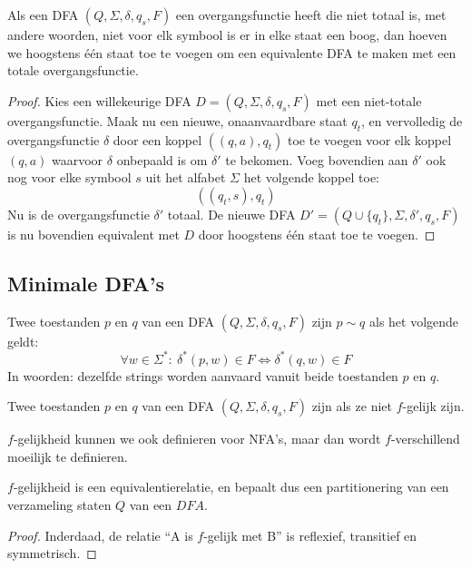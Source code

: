 \documentclass[main.tex]{subfiles}
\begin{document}
\begin{st}
  \label{st:dfa-totale-overgangsfunctie}
  Als een DFA $(Q,\Sigma,\delta,q_{s},F)$ een overgangsfunctie heeft die niet totaal is, met andere woorden, niet voor elk symbool is er in elke staat een boog, dan hoeven we hoogstens \'e\'en staat toe te voegen om een equivalente DFA te maken met een totale overgangsfunctie.

  \begin{proof}
   Kies een willekeurige DFA $D = (Q,\Sigma,\delta,q_{s},F)$ met een niet-totale overgangsfunctie.
   Maak nu een nieuwe, onaanvaardbare staat $q_{t}$, en vervolledig de overgangsfunctie $\delta$ door een koppel $((q,a),q_{t})$ toe te voegen voor elk koppel $(q,a)$ waarvoor $\delta$ onbepaald is om $\delta'$ te bekomen.
   Voeg bovendien aan $\delta'$ ook nog voor elke symbool $s$ uit het alfabet $\Sigma$ het volgende koppel toe:
   \[ ((q_{t},s),q_{t}) \]
   Nu is de overgangsfunctie $\delta'$ totaal.
   De nieuwe DFA $D' = (Q\cup\{ q_{t} \},\Sigma,\delta',q_{s},F)$ is nu bovendien equivalent met $D$ door hoogstens \'e\'en staat toe te voegen.
  \end{proof}
\end{st}

\subsection{Minimale DFA's}
\begin{de}
  \label{de:f-gelijk}
  Twee toestanden $p$ en $q$ van een DFA $(Q,\Sigma,\delta,q_{s},F)$ zijn  $p\sim q$ als het volgende geldt:
  \[
  \forall w \in \Sigma^{*}:\ \delta^{*}(p,w) \in F \Leftrightarrow \delta^{*}(q,w) \in F
  \]
  In woorden: dezelfde strings worden aanvaard vanuit beide toestanden $p$ en $q$.
\end{de}

\begin{de}
  Twee toestanden $p$ en $q$ van een DFA $(Q,\Sigma,\delta,q_{s},F)$ zijn  als ze niet $f$-gelijk zijn. 
\end{de}

\begin{opm}
  $f$-gelijkheid kunnen we ook definieren voor NFA's, maar dan wordt $f$-verschillend moeilijk te definieren.
\end{opm}

\begin{ei}
  $f$-gelijkheid is een equivalentierelatie, en bepaalt dus een partitionering van een verzameling staten $Q$ van een $DFA$.

  \begin{proof}
    Inderdaad, de relatie ``A is $f$-gelijk met B'' is reflexief, transitief en symmetrisch.
  \end{proof}
\end{ei}
\end{document}
